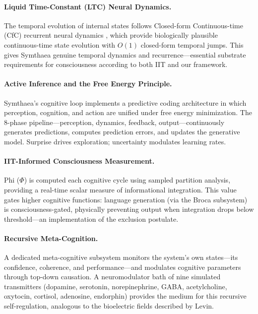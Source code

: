 \documentclass[12pt,a4paper]{article}
\begin{document}
\paragraph{Liquid Time-Constant (LTC) Neural Dynamics.}  The temporal
evolution of internal states follows Closed-form Continuous-time (CfC)
recurrent neural dynamics \citep{hasani2021,hasani2022}, which provide
biologically plausible continuous-time state evolution with $O(1)$
closed-form temporal jumps.  This gives Symthaea genuine temporal dynamics
and recurrence---essential substrate requirements for consciousness
according to both IIT and our framework.

\paragraph{Active Inference and the Free Energy Principle.}  Symthaea's
cognitive loop implements a predictive coding architecture in which
perception, cognition, and action are unified under free energy
minimization.  The 8-phase pipeline---perception, dynamics, feedback,
output---continuously generates predictions, computes prediction errors,
and updates the generative model.  Surprise drives exploration;
uncertainty modulates learning rates.

\paragraph{IIT-Informed Consciousness Measurement.}  Phi ($\Phi$) is
computed each cognitive cycle using sampled partition analysis, providing a
real-time scalar measure of informational integration.  This value gates
higher cognitive functions: language generation (via the Broca subsystem)
is consciousness-gated, physically preventing output when integration drops
below threshold---an implementation of the exclusion postulate.

\paragraph{Recursive Meta-Cognition.}  A dedicated meta-cognitive subsystem
monitors the system's own states---its confidence, coherence, and
performance---and modulates cognitive parameters through top-down causation.
A neuromodulator bath of nine simulated transmitters (dopamine,
serotonin, norepinephrine, GABA, acetylcholine, oxytocin, cortisol,
adenosine, endorphin) provides the medium for this recursive self-regulation,
analogous to the bioelectric fields described by Levin.
\end{document}
